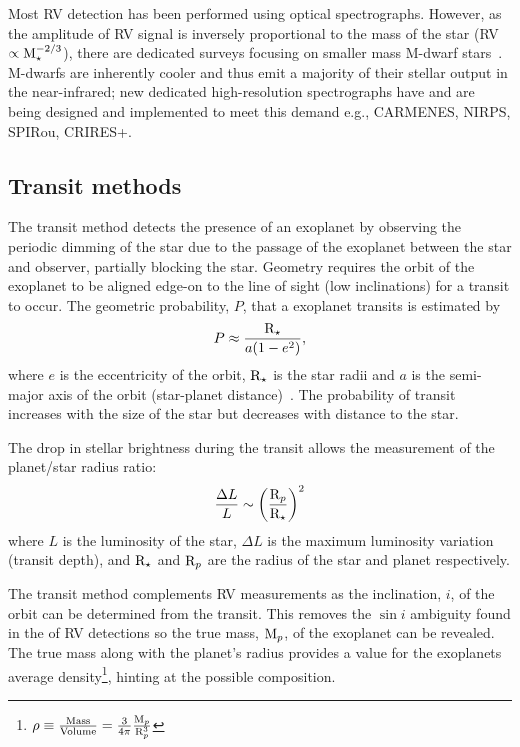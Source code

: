 Most {RV} detection has been performed using optical spectrographs.
However, as the amplitude of {RV} signal is inversely proportional to the mass of the star (RV $\propto \textrm{M}_{\star}^{-2/3}$), there are dedicated surveys focusing on smaller mass M-dwarf stars~\citep[e.g.][]{reiners_carmenes_2018}.
M-dwarfs are inherently cooler and thus emit a majority of their stellar output in the near-infrared; new dedicated high-resolution \nir{} spectrographs have and are being designed and implemented to meet this demand e.g., {CARMENES}, {NIRPS}, {SPIRou}, {CRIRES+}.


\subsection{Transit methods}
\label{sub:transit}
The transit method detects the presence of an exoplanet by observing the periodic dimming of the star due to the passage of the exoplanet between the star and observer, partially blocking the star.
Geometry requires the orbit of the exoplanet to be aligned edge-on to the line of sight (low inclinations) for a transit to occur.
The geometric probability, $P$, that a exoplanet transits is estimated by
\begin{equation}
P \approx \frac{\textrm{R}_{\star}}{a (1-{e}^{2})},
\end{equation}
where \(e\) is the eccentricity of the orbit, $\textrm{R}_{\star}$ is the star radii and \(a\) is the semi-major axis of the orbit (star-planet distance)~\citep{barnes_effects_2007}.
The probability of transit increases with the size of the star but decreases with distance to the star.

The drop in stellar brightness during the transit allows the measurement of the planet/star radius ratio:
\begin{equation}
    \frac{\Delta L}{L} \sim {\left(\frac{\textrm{R}_{p}}{\textrm{R}_{\star}}\right)}^{2}
\end{equation}
where \(L\) is the luminosity of the star, \(\Delta L\) is the maximum luminosity variation (transit depth), and \(\textrm{R}_{\star}\) and \(\textrm{R}_{p}\) are the radius of the star and planet respectively.

The transit method complements {RV} measurements as the inclination, $i$, of the orbit can be determined from the transit.
This removes the {$\sin{i}$} ambiguity found in the \Mpsini{} of {RV} detections so the true mass, $\textrm{M}_{p}$, of the exoplanet can be revealed.
The true mass along with the planet's radius provides a value for the exoplanets average density\footnote{$\rho \equiv \frac{\textrm{Mass}}{\textrm{Volume}} = \frac{3}{4\pi}\frac{\textrm{M}_{p}}{\textrm{R}_{p}^{3}}$}, hinting at the possible composition.

